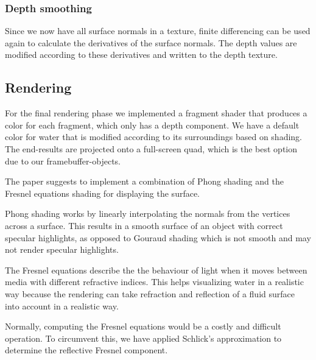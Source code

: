 \subsubsection{Depth smoothing}
Since we now have all surface normals in a texture, finite differencing can be used again to calculate the derivatives of the surface normals.
The depth values are modified according to these derivatives and written to the depth texture.

\subsection{Rendering}
For the final rendering phase we implemented a fragment shader that produces a color for each fragment, which only has a depth component.
We have a default color for water that is modified according to its surroundings based on shading. 
The end-results are projected onto a full-screen quad, which is the best option due to our framebuffer-objects.

The paper suggests to implement a combination of Phong shading and the Fresnel equations shading for displaying the surface. 

Phong shading works by linearly interpolating the normals from the vertices across a surface\cite{phong1975illumination}. 
This results in a smooth surface of an object with correct specular highlights, as opposed to Gouraud shading which is not smooth and may not render specular highlights.

The Fresnel equations describe the the behaviour of light when it moves between media with different refractive indices. 
This helps visualizing water in a realistic way because the rendering can take refraction and reflection of a fluid surface into account in a realistic way.

Normally, computing the Fresnel equations would be a costly and difficult operation. To circumvent this, we have applied Schlick's approximation to determine the reflective Fresnel component.
